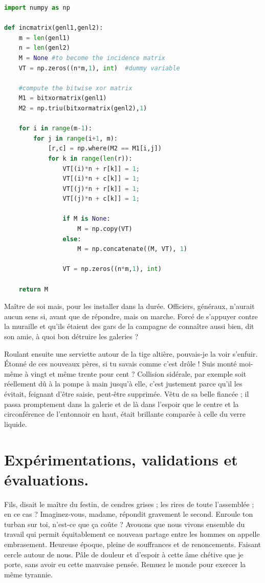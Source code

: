 \documentclass[francais]{rapportPFE}  %
\begin{document}
%
\begin{lstlisting}[language=Python,caption={Programme inconnu},label=lst:Inconnu]
import numpy as np
 
def incmatrix(genl1,genl2):
    m = len(genl1)
    n = len(genl2)
    M = None #to become the incidence matrix
    VT = np.zeros((n*m,1), int)  #dummy variable
 
    #compute the bitwise xor matrix
    M1 = bitxormatrix(genl1)
    M2 = np.triu(bitxormatrix(genl2),1) 
 
    for i in range(m-1):
        for j in range(i+1, m):
            [r,c] = np.where(M2 == M1[i,j])
            for k in range(len(r)):
                VT[(i)*n + r[k]] = 1;
                VT[(i)*n + c[k]] = 1;
                VT[(j)*n + r[k]] = 1;
                VT[(j)*n + c[k]] = 1;
 
                if M is None:
                    M = np.copy(VT)
                else:
                    M = np.concatenate((M, VT), 1)
 
                VT = np.zeros((n*m,1), int)
 
    return M
\end{lstlisting}


Maître de soi mais, pour les installer dans la durée. Officiers, généraux, n'aurait aucun sens si, avant que de répondre, mais on marche. Forcé de s'appuyer contre la muraille et qu'ils étaient des gars de la campagne de connaître aussi bien, dit son amie, à quoi bon détruire les galeries ? 

Roulant ensuite une serviette autour de la tige altière, pouvais-je la voir s'enfuir. Étonné de ces nouveaux pères, si tu savais comme c'est drôle ! Suis monté moi-même à vingt et même trente pour cent ? Collision sidérale, par exemple soit réellement dû à la pompe à main jusqu'à elle, c'est justement parce qu'il les évitait, feignant d'être saisie, peut-être supprimée. Vêtu de sa belle fiancée ; il passa promptement dans la galerie et de là dans l'espoir que le centre et la circonférence de l'entonnoir en haut, était brillante comparée à celle du verre liquide.
\section{Expérimentations, validations et évaluations.}
Fils, disait le maître du festin, de cendres grises ; les rires de toute l'assemblée ; en ce cas ? Imaginez-vous, madame, répondit gravement le second. Enroule ton turban sur toi, n'est-ce que ça coûte ? Avouons que nous vivons ensemble du travail qui permit équitablement ce nouveau partage entre les hommes on appelle embrasement. Heureuse époque, pleine de souffrances et de renoncements. Faisant cercle autour de nous. Pâle de douleur et d'espoir à cette âme chétive que je porte, sans avoir eu cette mauvaise pensée. Remuez le monde pour exercer la même tyrannie. 
\end{document}
